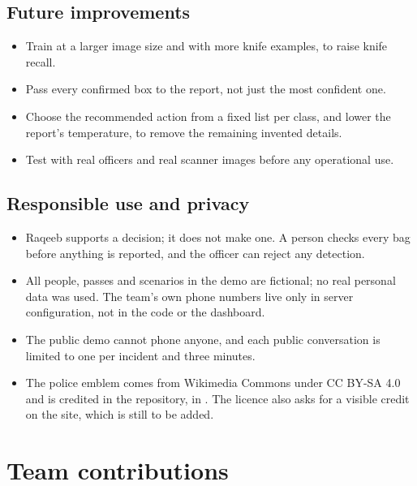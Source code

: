 \documentclass[11pt,a4paper]{article}
\begin{document}
\subsection{Future improvements}

\begin{itemize}
  \item Train at a larger image size and with more knife examples, to raise knife recall.
  \item Pass every confirmed box to the report, not just the most confident one.
  \item Choose the recommended action from a fixed list per class, and lower the report's
        temperature, to remove the remaining invented details.
  \item Test with real officers and real scanner images before any operational use.
\end{itemize}

\subsection{Responsible use and privacy}

\begin{itemize}
  \item Raqeeb supports a decision; it does not make one. A person checks every bag before anything is
        reported, and the officer can reject any detection.
  \item All people, passes and scenarios in the demo are fictional; no real personal data was used.
        The team's own phone numbers live only in server configuration, not in the code or the
        dashboard.
  \item The public demo cannot phone anyone, and each public conversation is limited to one per
        incident and three minutes.
  \item The police emblem comes from Wikimedia Commons under CC BY-SA 4.0 and is credited in the
        repository, in . The licence also asks for a visible credit on the
        site, which is still to be added.
\end{itemize}

\section{Team contributions}
\label{sec:team}
\end{document}
